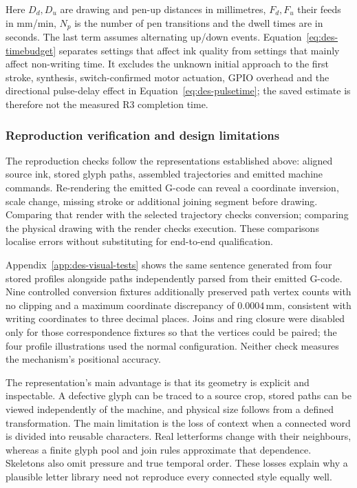 Here $D_d,D_u$ are drawing and pen-up distances in millimetres, $F_d,F_u$ their feeds in mm/min, $N_p$ is the number of pen transitions and the dwell times are in seconds. The last term assumes alternating up/down events. Equation~\ref{eq:des-timebudget} separates settings that affect ink quality from settings that mainly affect non-writing time. It excludes the unknown initial approach to the first stroke, synthesis, switch-confirmed motor actuation, GPIO overhead and the directional pulse-delay effect in Equation~\ref{eq:des-pulsetime}; the saved estimate is therefore not the measured R3 completion time.

\subsubsection{Reproduction verification and design limitations}
The reproduction checks follow the representations established above: aligned source ink, stored glyph paths, assembled trajectories and emitted machine commands. Re-rendering the emitted G-code can reveal a coordinate inversion, scale change, missing stroke or additional joining segment before drawing. Comparing that render with the selected trajectory checks conversion; comparing the physical drawing with the render checks execution. These comparisons localise errors without substituting for end-to-end qualification.

Appendix~\ref{app:des-visual-tests} shows the same sentence generated from four stored profiles alongside paths independently parsed from their emitted G-code. Nine controlled conversion fixtures additionally preserved path vertex counts with no clipping and a maximum coordinate discrepancy of $0.0004$\,mm, consistent with writing coordinates to three decimal places. Joins and ring closure were disabled only for those correspondence fixtures so that the vertices could be paired; the four profile illustrations used the normal configuration. Neither check measures the mechanism's positional accuracy.

The representation's main advantage is that its geometry is explicit and inspectable. A defective glyph can be traced to a source crop, stored paths can be viewed independently of the machine, and physical size follows from a defined transformation. The main limitation is the loss of context when a connected word is divided into reusable characters. Real letterforms change with their neighbours, whereas a finite glyph pool and join rules approximate that dependence. Skeletons also omit pressure and true temporal order. These losses explain why a plausible letter library need not reproduce every connected style equally well.

